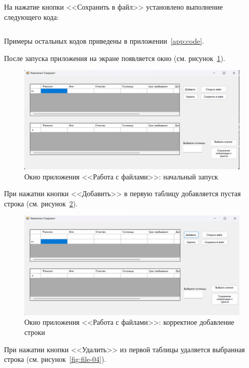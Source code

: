 \documentclass[bachelor, och, pract, times]{SCWorks}
\begin{document}
На нажатие кнопки <<Сохранить в файл>> установлено выполнение следующего кода:
\inputminted[fontsize=\footnotesize]{cpp}{Файл/Save.cpp}

Примеры остальных кодов приведены в приложении~\ref{app:code}.

После запуска приложения на экране появляется окно (см. рисунок~\ref{fig:file-02}).

\begin{figure}[H]
    \centering
    \includegraphics[scale=0.45]{Скрины/Снимок экрана 2025-01-05 142031.png}
    \caption{Окно приложения <<Работа с файлами>>: начальный запуск}\label{fig:file-02}
\end{figure}

При нажатии кнопки <<Добавить>> в первую таблицу добавляется пустая строка (см. рисунок~\ref{fig:file-03}).

\begin{figure}[H]
    \centering
    \includegraphics[scale=0.45]{Скрины/Снимок экрана 2025-01-05 142140.png}
    \caption{Окно приложения <<Работа с файлами>>: корректное добавление строки}\label{fig:file-03}
\end{figure}

При нажатии кнопки <<Удалить>> из первой таблицы удаляется выбранная строка (см. рисунок~\ref{fig:file-04}).
\end{document}

